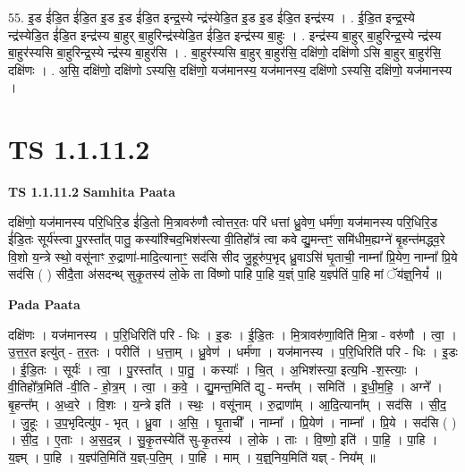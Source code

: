 \documentclass[17pt]{extarticle}
\begin{document}
55. इ॒ड ई॑डि॒त ई॑डि॒त इ॒ड इ॒ड ई॑डि॒त इन्द्र॒स्ये न्द्र॑स्येडि॒त इ॒ड इ॒ड ई॑डि॒त इन्द्र॑स्य । . ई॒डि॒त इन्द्र॒स्ये न्द्र॑स्येडि॒त ई॑डि॒त इन्द्र॑स्य बा॒हुर् बा॒हुरिन्द्र॑स्येडि॒त ई॑डि॒त इन्द्र॑स्य बा॒हुः । . इन्द्र॑स्य बा॒हुर् बा॒हुरिन्द्र॒स्ये न्द्र॑स्य बा॒हुर॑स्यसि बा॒हुरिन्द्र॒स्ये न्द्र॑स्य बा॒हुर॑सि । . बा॒हुर॑स्यसि बा॒हुर् बा॒हुर॑सि॒ दक्षि॑णो॒ दक्षि॑णो ऽसि बा॒हुर् बा॒हुर॑सि॒ दक्षि॑णः । . अ॒सि॒ दक्षि॑णो॒ दक्षि॑णो ऽस्यसि॒ दक्षि॑णो॒ यज॑मानस्य॒ यज॑मानस्य॒ दक्षि॑णो ऽस्यसि॒ दक्षि॑णो॒ यज॑मानस्य । \newline
\pagebreak
{}

\section{ TS 1.1.11.2 }

\textbf{TS 1.1.11.2 } \newline
\textbf{Samhita Paata} \newline

दक्षि॑णो॒ यज॑मानस्य परि॒धिरि॒ड ई॑डि॒तो मि॒त्रावरु॑णौ त्वोत्तर॒तः परि॑ धत्तां ध्रु॒वेण॒ धर्म॑णा॒ यज॑मानस्य परि॒धिरि॒ड ई॑डि॒तः सूर्य॑स्त्वा पु॒रस्ता᳚त् पातु॒ कस्या᳚श्चिद॒भिश॑स्त्या वी॒तिहो᳚त्रं त्वा कवे द्यु॒मन्तꣳ॒॒ समि॑धीम॒ह्यग्ने॑ बृ॒हन्त॑मद्ध्व॒रे वि॒शो य॒न्त्रे स्थो॒ वसू॑नाꣳ रु॒द्राणा॑-मादि॒त्यानाꣳ॒॒ सद॑सि सीद जु॒हूरु॑प॒भृद् ध्रु॒वाऽसि॑ घृ॒ताची॒ नाम्ना᳚ प्रि॒येण॒ नाम्ना᳚ प्रि॒ये सद॑सि ( ) सीदै॒ता अ॑सदन्थ् सुकृ॒तस्य॑ लो॒के ता वि॑ष्णो पाहि पा॒हि य॒ज्ञ्ं पा॒हि य॒ज्ञ्प॑तिं पा॒हि मां ॅय॑ज्ञ्॒नियं᳚ ॥ \newline

\textbf{Pada Paata} \newline

दक्षि॑णः । यज॑मानस्य । प॒रि॒धिरिति॑ परि - धिः । इ॒डः । ई॒डि॒तः । मि॒त्रावरु॑णा॒विति॑ मि॒त्रा - वरु॑णौ । त्वा॒ । उ॒त्त॒र॒त इत्यु॑त् - त॒र॒तः । परीति॑ । ध॒त्ता॒म् । ध्रु॒वेण॑ । धर्म॑णा । यज॑मानस्य । प॒रि॒धिरिति॑ परि - धिः । इ॒डः । ई॒डि॒तः । सूर्यः॑ । त्वा॒ । पु॒रस्ता᳚त् । पा॒तु॒ । कस्याः᳚ । चि॒त् । अ॒भिश॑स्त्या॒ इत्य॒भि -श॒स्त्याः॒ । वी॒तिहो᳚त्र॒मिति॑ -वी॒ति - हो॒त्र॒म् । त्वा॒ । क॒वे॒ । द्यु॒मन्त॒मिति॑ द्यु - मन्त᳚म् । समिति॑ । इ॒धी॒म॒हि॒ । अग्ने᳚ । बृ॒हन्त᳚म् । अ॒ध्व॒रे । वि॒शः । य॒न्त्रे इति॑ । स्थः॒ । वसू॑नाम् । रु॒द्राणा᳚म् । आ॒दि॒त्याना᳚म् । सद॑सि । सी॒द॒ । जु॒हूः । उ॒प॒भृदित्यु॑प - भृत् । ध्रु॒वा । अ॒सि॒ । घृ॒ताची᳚ । नाम्ना᳚ । प्रि॒येण॑ । नाम्ना᳚ । प्रि॒ये । सद॑सि ( ) । सी॒द॒ । ए॒ताः । अ॒स॒द॒न्न् । सु॒कृ॒तस्येति॑ सु-कृ॒तस्य॑ । लो॒के । ताः । वि॒ष्णो॒ इति॑ । पा॒हि॒ । पा॒हि । य॒ज्ञ्म् । पा॒हि । य॒ज्ञ्प॑ति॒मिति॑ य॒ज्ञ्-प॒ति॒म् । पा॒हि । माम् । य॒ज्ञ्॒निय॒मिति॑ यज्ञ् - निय᳚म् ॥  \newline
\end{document}
